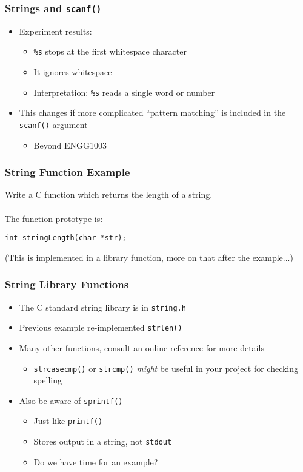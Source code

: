 \documentclass[14pt]{beamer}
\begin{document}
\begin{frame}
\frametitle{Strings and \texttt{scanf()}}
\begin{itemize}
\item Experiment results:
	\begin{itemize}
		\item \texttt{\%s} stops at the first whitespace character
		\item It ignores  whitespace
		\item Interpretation: \texttt{\%s} reads a single word or number
	\end{itemize}
\item This changes if more complicated ``pattern matching'' is included in the \texttt{scanf()} argument
	\begin{itemize}
		\item Beyond ENGG1003
	\end{itemize}
\end{itemize}
\end{frame}

\begin{frame}[fragile]
\frametitle{String Function Example}
Write a C function which returns the length of a string.
\\~\\
The function prototype is:

\begin{lstlisting}[style=CStyle]
int stringLength(char *str);
\end{lstlisting}
(This is implemented in a library function, more on that after the example...)
\end{frame}

\begin{frame}
\frametitle{String Library Functions}
\begin{itemize}
\item The C standard string library is in \texttt{string.h}
\item Previous example re-implemented \texttt{strlen()}
\item Many other functions, consult an online reference for more details
	\begin{itemize}
		\item \texttt{strcasecmp()} or \texttt{strcmp()} \textit{might} be useful in your project for checking spelling
	\end{itemize}
\item Also be aware of \texttt{sprintf()}
	\begin{itemize}
		\item Just like \texttt{printf()}
		\item Stores output in a string, not \texttt{stdout}
		\item Do we have time for an example?
	\end{itemize}
\end{itemize}
\end{frame}
\end{document}
